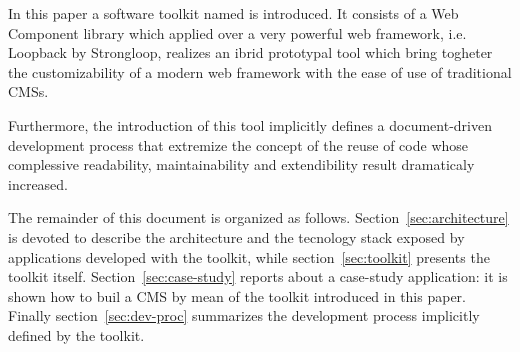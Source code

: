 In this paper a software toolkit named  is introduced. It consists of a Web Component library which applied over a very powerful web framework, i.e. Loopback by Strongloop, realizes an ibrid prototypal tool which bring togheter the customizability of a modern web framework with the ease of use of traditional CMSs.

Furthermore, the introduction of this tool implicitly defines a document-driven development process that extremize the concept of the reuse of code whose complessive readability, maintainability and extendibility result dramaticaly increased.


The remainder of this document is organized as follows. Section~\ref{sec:architecture} is devoted to describe the architecture and the tecnology stack exposed by applications developed with the toolkit, while section~\ref{sec:toolkit} presents the toolkit itself. Section~\ref{sec:case-study} reports about a case-study application: it is shown how to buil a CMS by mean of the toolkit introduced in this paper. Finally section~\ref{sec:dev-proc} summarizes the development process implicitly defined by the  toolkit.

